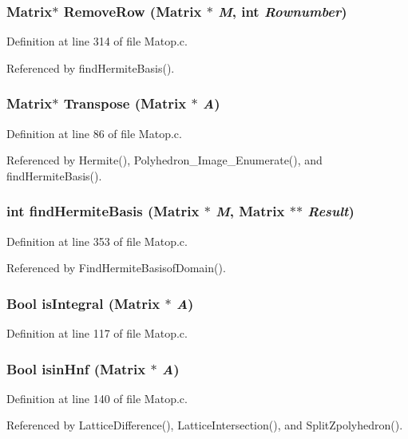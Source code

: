 \subsubsection{\setlength{\rightskip}{0pt plus 5cm}Matrix$\ast$ Remove\-Row (Matrix $\ast$ {\em M}, int {\em Rownumber})}\label{Matop_8c_a14}




Definition at line 314 of file Matop.c.

Referenced by find\-Hermite\-Basis().

\subsubsection{\setlength{\rightskip}{0pt plus 5cm}Matrix$\ast$ Transpose (Matrix $\ast$ {\em A})}\label{Matop_8c_a4}




Definition at line 86 of file Matop.c.

Referenced by Hermite(), Polyhedron\_\-Image\_\-Enumerate(), and find\-Hermite\-Basis().

\subsubsection{\setlength{\rightskip}{0pt plus 5cm}int find\-Hermite\-Basis (Matrix $\ast$ {\em M}, Matrix $\ast$$\ast$ {\em Result})}\label{Matop_8c_a16}




Definition at line 353 of file Matop.c.

Referenced by Find\-Hermite\-Basisof\-Domain().

\subsubsection{\setlength{\rightskip}{0pt plus 5cm}Bool is\-Integral (Matrix $\ast$ {\em A})}\label{Matop_8c_a6}




Definition at line 117 of file Matop.c.
\subsubsection{\setlength{\rightskip}{0pt plus 5cm}Bool isin\-Hnf (Matrix $\ast$ {\em A})}\label{Matop_8c_a7}




Definition at line 140 of file Matop.c.

Referenced by Lattice\-Difference(), Lattice\-Intersection(), and Split\-Zpolyhedron().

